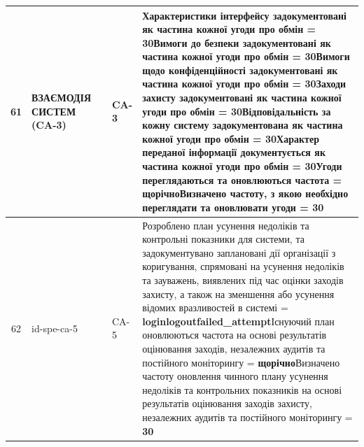 \documentclass[10pt]{article}
\begin{document}
\begin{longtable}{|c|>{\raggedright\arraybackslash}p{4cm}|>{\raggedright\arraybackslash}p{2.5cm}|>{\raggedright\arraybackslash}p{3.5cm}|>{\raggedright\arraybackslash}p{5.5cm}|}
61 & ВЗАЄМОДІЯ СИСТЕМ (CA-3) &  & CA-3 & Характеристики інтерфейсу задокументовані як частина кожної угоди про обмін = \textbf{30}\newline Вимоги до безпеки задокументовані як частина кожної угоди про обмін = \textbf{30}\newline Вимоги щодо конфіденційності задокументовані як частина кожної угоди про обмін = \textbf{30}\newline Заходи захисту задокументовані як частина кожної угоди про обмін = \textbf{30}\newline Відповідальність за кожну систему задокументована як частина кожної угоди про обмін = \textbf{30}\newline Характер переданої інформації документується як частина кожної угоди про обмін = \textbf{30}\newline Угоди переглядаються та оновлюються частота = \textbf{щорічно}\newline Визначено частоту, з якою необхідно переглядати та оновлювати угоди = \textbf{30} \\ \hline
62 & id-spe-ca-5 &  & CA-5 & Розроблено план усунення недоліків та контрольні показники для системи, та задокументувано заплановані дії організації з коригування, спрямовані на усунення недоліків та зауважень, виявлених під час оцінки заходів захисту, а також на зменшення або усунення відомих вразливостей в системі = \textbf{loginlogoutfailed\_\allowbreak{}attempt}\newline Існуючий план оновлюються частота на основі результатів оцінювання заходів, незалежних аудитів та постійного моніторингу = \textbf{щорічно}\newline Визначено частоту оновлення чинного плану усунення недоліків та контрольних показників на основі результатів оцінювання заходів захисту, незалежних аудитів та постійного моніторингу = \textbf{30} \\ \hline

\end{longtable}
\end{document}
